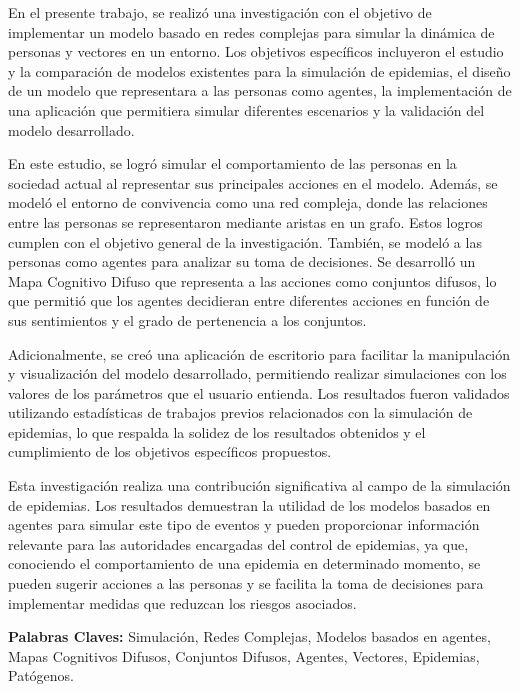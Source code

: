 \begin{resumen}
	En el presente trabajo, se realizó una investigación con el objetivo de implementar 
    un modelo basado en redes complejas para simular la dinámica de personas y vectores 
    en un entorno. Los objetivos específicos incluyeron el estudio y la comparación de 
    modelos existentes para la simulación de epidemias, el diseño de un modelo que 
    representara a las personas como agentes, la implementación de una aplicación que 
    permitiera simular diferentes escenarios y la validación del modelo desarrollado.

    En este estudio, se logró simular el comportamiento de las personas en la sociedad actual 
    al representar sus principales acciones en el modelo. Además, se modeló el entorno de 
    convivencia como una red compleja, donde las relaciones entre las personas se 
    representaron mediante aristas en un grafo. Estos logros cumplen con el objetivo general 
    de la investigación. También, se modeló a las personas como agentes para analizar su toma 
    de decisiones. Se desarrolló un Mapa Cognitivo Difuso que representa a las acciones como 
    conjuntos difusos, lo que permitió que los agentes decidieran entre diferentes acciones 
    en función de sus sentimientos y el grado de pertenencia a los conjuntos.

    Adicionalmente, se creó una aplicación de escritorio para facilitar la manipulación y 
    visualización del modelo desarrollado, permitiendo realizar simulaciones con los valores 
    de los parámetros que el usuario entienda. Los resultados fueron validados 
    utilizando estadísticas de trabajos previos relacionados con la simulación de epidemias, 
    lo que respalda la solidez de los resultados obtenidos y el cumplimiento de los objetivos 
    específicos propuestos.

    Esta investigación realiza una contribución significativa al campo de la simulación de 
    epidemias. Los resultados demuestran la utilidad de los modelos basados en 
    agentes para simular este tipo de eventos y pueden proporcionar información relevante para las 
    autoridades encargadas del control de epidemias, ya que, conociendo el comportamiento de una 
    epidemia en determinado momento, se pueden sugerir acciones a las personas y se facilita la 
    toma de decisiones para implementar medidas que reduzcan los riesgos asociados.

	\textbf{Palabras Claves:} Simulación, Redes Complejas, Modelos basados en agentes, Mapas Cognitivos Difusos,
	Conjuntos Difusos, Agentes, Vectores, Epidemias, Patógenos.
\end{resumen}

